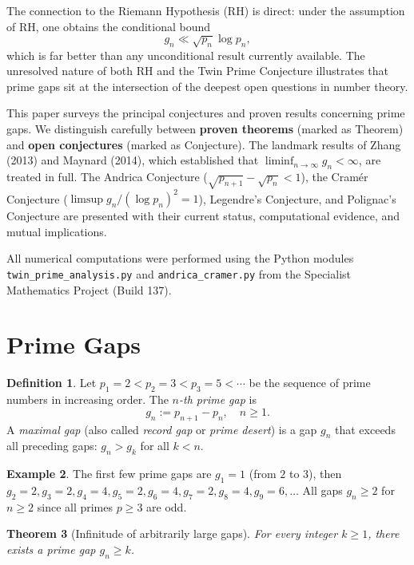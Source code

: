 \documentclass[12pt,a4paper]{amsart}
\newtheorem{theorem}{Theorem}[section]
\theoremstyle{definition}
\newtheorem{definition}[theorem]{Definition}
\newtheorem{example}[theorem]{Example}
\begin{document}
The connection to the Riemann Hypothesis (RH) is direct: under the assumption of
RH, one obtains the conditional bound
\[
  g_n \ll \sqrt{p_n} \log p_n,
\]
which is far better than any unconditional result currently available. The
unresolved nature of both RH and the Twin Prime Conjecture illustrates that prime
gaps sit at the intersection of the deepest open questions in number theory.

This paper surveys the principal conjectures and proven results concerning prime
gaps. We distinguish carefully between \textbf{proven theorems} (marked as
Theorem) and \textbf{open conjectures} (marked as Conjecture). The landmark
results of Zhang (2013) and Maynard (2014), which established that
$\liminf_{n\to\infty} g_n < \infty$, are treated in full. The Andrica
Conjecture ($\sqrt{p_{n+1}} - \sqrt{p_n} < 1$), the Cram\'{e}r Conjecture
($\limsup g_n / (\log p_n)^2 = 1$), Legendre's Conjecture, and Polignac's
Conjecture are presented with their current status, computational evidence, and
mutual implications.

All numerical computations were performed using the Python modules
\texttt{twin\_prime\_analysis.py} and \texttt{andrica\_cramer.py} from the
Specialist Mathematics Project (Build 137).

\section{Prime Gaps}

\begin{definition}
Let $p_1 = 2 < p_2 = 3 < p_3 = 5 < \cdots$ be the sequence of prime numbers in
increasing order. The \emph{$n$-th prime gap} is
\[
  g_n := p_{n+1} - p_n, \quad n \geq 1.
\]
A \emph{maximal gap} (also called \emph{record gap} or \emph{prime desert}) is a
gap $g_n$ that exceeds all preceding gaps: $g_n > g_k$ for all $k < n$.
\end{definition}

\begin{example}
The first few prime gaps are $g_1 = 1$ (from $2$ to $3$), then
$g_2 = 2, g_3 = 2, g_4 = 4, g_5 = 2, g_6 = 4, g_7 = 2, g_8 = 4, g_9 = 6,
\ldots$ All gaps $g_n \geq 2$ for $n \geq 2$ since all primes $p \geq 3$ are odd.
\end{example}

\begin{theorem}[Infinitude of arbitrarily large gaps]
For every integer $k \geq 1$, there exists a prime gap $g_n \geq k$.
\end{theorem}
\end{document}
